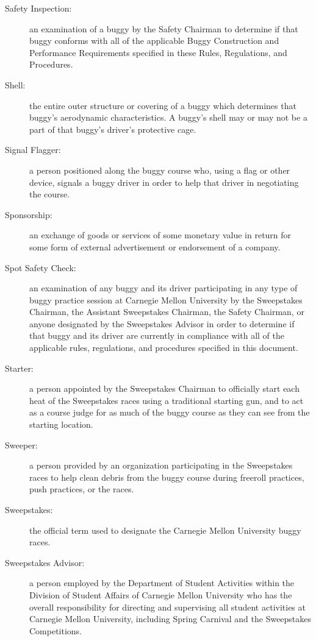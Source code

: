 \begin{description}
	\item[Safety Inspection:]
	an examination of a buggy by the Safety Chairman to determine if that buggy conforms with all of the applicable Buggy Construction and Performance Requirements specified in these Rules, Regulations, and Procedures.

	\item[Shell:]
	the entire outer structure or covering of a buggy which determines that buggy's aerodynamic characteristics. A buggy's shell may or may not be a part of that buggy's driver's protective cage.

	\item[Signal Flagger:]
	a person positioned along the buggy course who, using a flag or other device, signals a buggy driver in order to help that driver in negotiating the course.

	\item[Sponsorship:]
	an exchange of goods or services of some monetary value in return for some form of external advertisement or endorsement of a company.

	\item[Spot Safety Check:]
	an examination of any buggy and its driver participating in any type of buggy practice session at Carnegie Mellon University by the Sweepstakes Chairman, the Assistant Sweepstakes Chairman, the Safety Chairman, or anyone designated by the Sweepstakes Advisor in order to determine if that buggy and its driver are currently in compliance with all of the applicable rules, regulations, and procedures specified in this document.

	\item[Starter:]
	a person appointed by the Sweepstakes Chairman to officially start each heat of the Sweepstakes races using a traditional starting gun, and to act as a course judge for as much of the buggy course as they can see from the starting location.

	\item[Sweeper:]
	a person provided by an organization participating in the Sweepstakes races to help clean debris from the buggy course during freeroll practices, push practices, or the races.

	\item[Sweepstakes:]
	the official term used to designate the Carnegie Mellon University buggy races.

	\item[Sweepstakes Advisor:]
	a person employed by the Department of Student Activities within the Division of Student Affairs of Carnegie Mellon University who has the overall responsibility for directing and supervising all student activities at Carnegie Mellon University, including Spring Carnival and the Sweepstakes Competitions.


\end{description}
